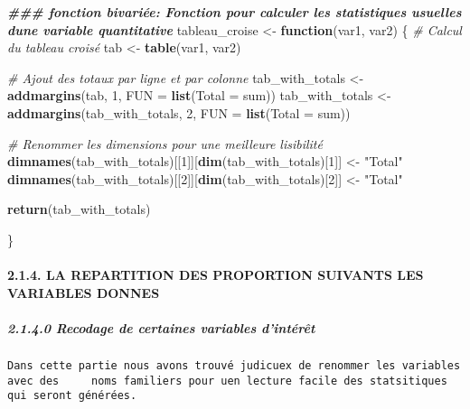 \documentclass[
]{article}
\newenvironment{Shaded}{\begin{snugshade}}{\end{snugshade}}
\newcommand{\AttributeTok}[1]{\textcolor[rgb]{0.13,0.29,0.53}{#1}}
\newcommand{\CommentTok}[1]{\textcolor[rgb]{0.56,0.35,0.01}{\textit{#1}}}
\newcommand{\ControlFlowTok}[1]{\textcolor[rgb]{0.13,0.29,0.53}{\textbf{#1}}}
\newcommand{\DecValTok}[1]{\textcolor[rgb]{0.00,0.00,0.81}{#1}}
\newcommand{\DocumentationTok}[1]{\textcolor[rgb]{0.56,0.35,0.01}{\textbf{\textit{#1}}}}
\newcommand{\FunctionTok}[1]{\textcolor[rgb]{0.13,0.29,0.53}{\textbf{#1}}}
\newcommand{\NormalTok}[1]{#1}
\newcommand{\OtherTok}[1]{\textcolor[rgb]{0.56,0.35,0.01}{#1}}
\newcommand{\StringTok}[1]{\textcolor[rgb]{0.31,0.60,0.02}{#1}}
\begin{document}
\begin{Shaded}
\begin{Highlighting}[]
\DocumentationTok{\#\#\# fonction bivariée: Fonction pour calculer les statistiques usuelles d\textquotesingle{}une variable quantitative}
\NormalTok{tableau\_croise }\OtherTok{\textless{}{-}} \ControlFlowTok{function}\NormalTok{(var1, var2) \{}
  \CommentTok{\# Calcul du tableau croisé}
\NormalTok{  tab }\OtherTok{\textless{}{-}} \FunctionTok{table}\NormalTok{(var1, var2)}
  
  \CommentTok{\# Ajout des totaux par ligne et par colonne}
\NormalTok{  tab\_with\_totals }\OtherTok{\textless{}{-}} \FunctionTok{addmargins}\NormalTok{(tab, }\DecValTok{1}\NormalTok{, }\AttributeTok{FUN =} \FunctionTok{list}\NormalTok{(}\AttributeTok{Total =}\NormalTok{ sum))}
\NormalTok{  tab\_with\_totals }\OtherTok{\textless{}{-}} \FunctionTok{addmargins}\NormalTok{(tab\_with\_totals, }\DecValTok{2}\NormalTok{, }\AttributeTok{FUN =} \FunctionTok{list}\NormalTok{(}\AttributeTok{Total =}\NormalTok{ sum))}
  
  \CommentTok{\# Renommer les dimensions pour une meilleure lisibilité}
  \FunctionTok{dimnames}\NormalTok{(tab\_with\_totals)[[}\DecValTok{1}\NormalTok{]][}\FunctionTok{dim}\NormalTok{(tab\_with\_totals)[}\DecValTok{1}\NormalTok{]] }\OtherTok{\textless{}{-}} \StringTok{"Total"}
  \FunctionTok{dimnames}\NormalTok{(tab\_with\_totals)[[}\DecValTok{2}\NormalTok{]][}\FunctionTok{dim}\NormalTok{(tab\_with\_totals)[}\DecValTok{2}\NormalTok{]] }\OtherTok{\textless{}{-}} \StringTok{"Total"}
  
  \FunctionTok{return}\NormalTok{(tab\_with\_totals)}
  
  

\NormalTok{\}}
\end{Highlighting}
\end{Shaded}

\hypertarget{la-repartition-des-proportion-suivants-les-variables-donnes}{%
\paragraph{2.1.4. LA REPARTITION DES PROPORTION SUIVANTS LES VARIABLES
DONNES}\label{la-repartition-des-proportion-suivants-les-variables-donnes}}

\hypertarget{recodage-de-certaines-variables-dintuxe9ruxeat}{%
\subparagraph{2.1.4.0 Recodage de certaines variables
d'intérêt}\label{recodage-de-certaines-variables-dintuxe9ruxeat}}

\begin{verbatim}
Dans cette partie nous avons trouvé judicuex de renommer les variables avec des     noms familiers pour uen lecture facile des statsitiques qui seront générées.
\end{verbatim}
\end{document}
